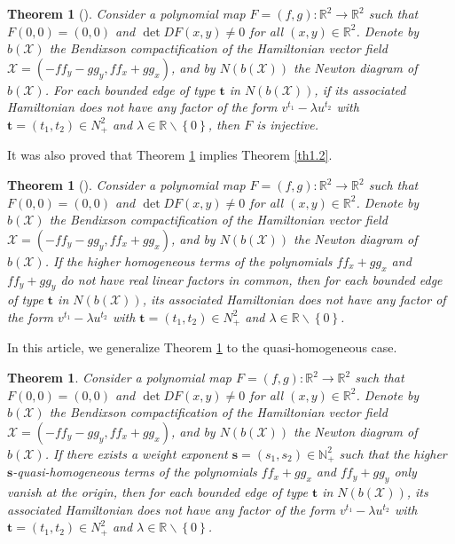 \documentclass[10pt,a4paper]{amsart}
\numberwithin{equation}{section}
\newtheorem{theorem}[theo]{Theorem}
\begin{document}
\begin{theorem}[\cite{bib 25}] \label{th1.6}
Consider a polynomial map $ F=(f, g):\mathbb{R}^2 \to \mathbb{R}^2 $ such that 
$ F(0,0)=(0,0) $ and $ \det DF(x,y)\neq 0 $ for all $ (x,y)\in \mathbb{R}^2 $. 
Denote by $ b(\mathcal{X}) $ the Bendixson compactification of the Hamiltonian vector 
field $ \mathcal{X}=(-ff_{y}-gg_{y}, ff_{x}+gg_{x})$, and by $ N(b(\mathcal{X})) $ 
the Newton diagram of $ b(\mathcal{X}) $. For each bounded edge of type 
$ \mathbf{t} $ in $ N(b(\mathcal{X})) $, if its associated Hamiltonian does not have 
any factor of the form $ v^{t_1}-\lambda u^{t_2} $ with 
$ \mathbf{t}=(t_{1},t_{2})\in N_{+}^{2} $ and 
$ \lambda \in \mathbb{R}\backslash \left\{0\right\} $, then $ F $ is injective.
\end{theorem}

It was also  proved that Theorem \ref{th1.6}  implies Theorem \ref{th1.2}.

\begin{theorem}[\cite{bib 25}] \label{th1.7}
Consider a polynomial map $ F=(f, g):\mathbb{R}^2 \to \mathbb{R}^2 $ such that 
$ F(0,0)=(0,0) $ and $ \det DF(x,y)\neq 0 $ for all $ (x,y)\in \mathbb{R}^2 $. 
Denote by $ b(\mathcal{X}) $ the Bendixson compactification of the Hamiltonian vector 
field $ \mathcal{X}=(-ff_{y}-gg_{y}, ff_{x}+gg_{x})$, and by $ N(b(\mathcal{X})) $ 
the Newton diagram of $ b(\mathcal{X}) $. If the higher homogeneous terms of the 
polynomials $ ff_{x}+gg_{x} $ and $ ff_{y}+gg_{y} $ do not have real linear factors 
in common, then for each bounded edge of type $ \mathbf{t} $ in $ N(b(\mathcal{X})) $, 
its associated Hamiltonian does not have any factor of the form 
$ v^{t_1}-\lambda u^{t_2} $ with $ \mathbf{t}=(t_{1},t_{2})\in N_{+}^{2} $ and 
$ \lambda \in \mathbb{R}\backslash \left\{0\right\}$.
\end{theorem}

In this article, we generalize Theorem \ref{th1.7} to the quasi-homogeneous case.


\begin{theorem}\label{th1.8}
Consider a polynomial map $ F=(f,g):\mathbb{R}^2 \to \mathbb{R}^2 $ such that 
$ F(0,0)=(0,0) $ and $ \det DF(x,y)\neq 0 $ for all $ (x,y)\in \mathbb{R}^2 $. 
Denote by $ b(\mathcal{X}) $ the Bendixson compactification of the Hamiltonian vector 
field $ \mathcal{X}=(-ff_{y}-gg_{y}, ff_{x}+gg_{x}) $, and by $ N(b(\mathcal{X})) $ 
the Newton diagram of $ b(\mathcal{X}) $. If there exists a weight exponent 
$\mathbf{s}=(s_1,s_2)\in \mathbb{N}_{+}^{2}$ such that the higher 
$\mathbf{s}$-quasi-homogeneous terms of the polynomials $ ff_{x}+gg_{x} $ and 
$ ff_{y}+gg_{y} $ only vanish at the origin, then for each bounded edge of type 
$ \mathbf{t} $ in $ N(b(\mathcal{X})) $, its associated Hamiltonian does not have any 
factor of the form $ v^{t_1}-\lambda u^{t_2} $ with 
$ \mathbf{t}=(t_{1},t_{2})\in N_{+}^{2} $ and 
$ \lambda \in \mathbb{R}\backslash \left\{0\right\} $.
\end{theorem}
\end{document}
